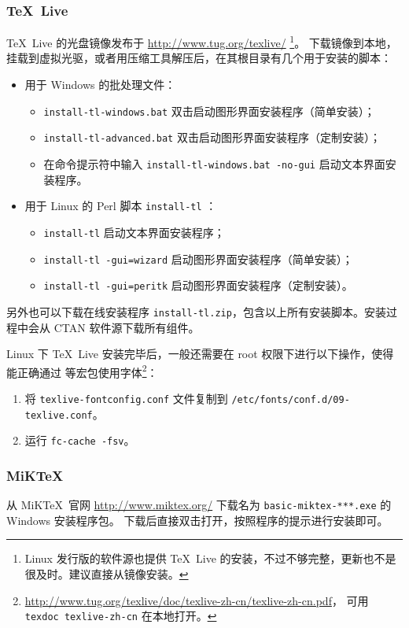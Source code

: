 \subsubsection{\TeX\ Live}

\TeX\ Live 的光盘镜像发布于 \url{http://www.tug.org/texlive/}%
\footnote{Linux 发行版的软件源也提供 \TeX\ Live 的安装，不过不够完整，更新也不是很及时。建议直接从镜像安装。}。
下载镜像到本地，挂载到虚拟光驱，或者用压缩工具解压后，在其根目录有几个用于安装的脚本：
\begin{itemize}
  \item 用于 Windows 的批处理文件：
  \begin{itemize}
    \item \texttt{install-tl-windows.bat} 双击启动图形界面安装程序（简单安装）；
    \item \texttt{install-tl-advanced.bat} 双击启动图形界面安装程序（定制安装）；
    \item 在命令提示符中输入 \texttt{install-tl-windows.bat -no-gui} 启动文本界面安装程序。
  \end{itemize}
  \item 用于 Linux 的 Perl 脚本 \texttt{install-tl} ：
  \begin{itemize}
    \item \texttt{install-tl} 启动文本界面安装程序；
    \item \texttt{install-tl -gui=wizard} 启动图形界面安装程序（简单安装）；
    \item \texttt{install-tl -gui=peritk} 启动图形界面安装程序（定制安装）。
  \end{itemize}
\end{itemize}
另外也可以下载在线安装程序 \texttt{install-tl.zip}，包含以上所有安装脚本。安装过程中会从 CTAN 软件源下载所有组件。

Linux 下 \TeX\ Live 安装完毕后，一般还需要在 root 权限下进行以下操作，使得  能正确通过 
等宏包使用字体\footnote{\url{http://www.tug.org/texlive/doc/texlive-zh-cn/texlive-zh-cn.pdf}，%
可用 \texttt{texdoc texlive-zh-cn} 在本地打开。}：
\begin{enumerate}
  \item 将 \texttt{texlive-fontconfig.conf} 文件复制到 \texttt{/etc/fonts/conf.d/09-texlive.conf}。
  \item 运行 \texttt{fc-cache -fsv}。
\end{enumerate}

\subsubsection{MiK\TeX}
从 MiK\TeX\ 官网 \url{http://www.miktex.org/} 下载名为 \texttt{basic-miktex-***.exe} 的 Windows 安装程序包。
下载后直接双击打开，按照程序的提示进行安装即可。

